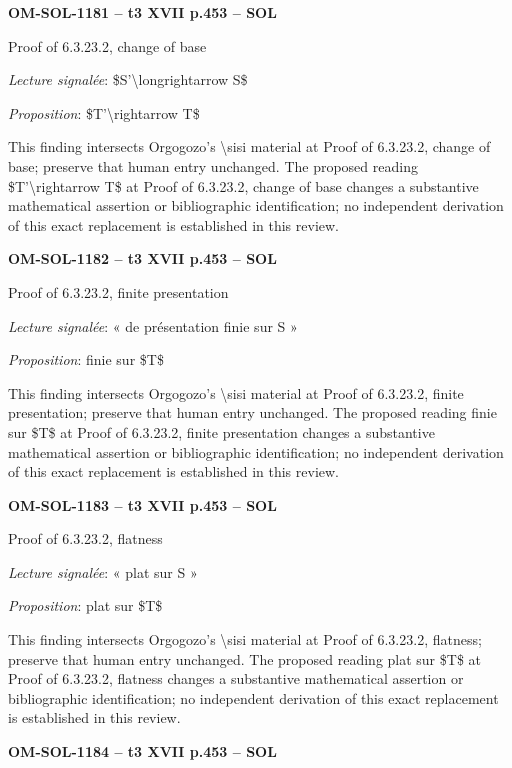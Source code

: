 \par\noindent\textbf{OM-SOL-1181 -- t3 XVII p.453 -- SOL}\par
Proof of 6.3.23.2, change of base\par
\emph{Lecture signalée}: \$S'\textbackslash{}longrightarrow S\$\par
\emph{Proposition}: \$T'\textbackslash{}rightarrow T\$\par
This finding intersects Orgogozo's \textbackslash{}sisi material at Proof of 6.3.23.2, change of base; preserve that human entry unchanged. The proposed reading \$T'\textbackslash{}rightarrow T\$ at Proof of 6.3.23.2, change of base changes a substantive mathematical assertion or bibliographic identification; no independent derivation of this exact replacement is established in this review.\par
\par\noindent\textbf{OM-SOL-1182 -- t3 XVII p.453 -- SOL}\par
Proof of 6.3.23.2, finite presentation\par
\emph{Lecture signalée}: « de présentation finie sur S »\par
\emph{Proposition}: finie sur \$T\$\par
This finding intersects Orgogozo's \textbackslash{}sisi material at Proof of 6.3.23.2, finite presentation; preserve that human entry unchanged. The proposed reading finie sur \$T\$ at Proof of 6.3.23.2, finite presentation changes a substantive mathematical assertion or bibliographic identification; no independent derivation of this exact replacement is established in this review.\par
\par\noindent\textbf{OM-SOL-1183 -- t3 XVII p.453 -- SOL}\par
Proof of 6.3.23.2, flatness\par
\emph{Lecture signalée}: « plat sur S »\par
\emph{Proposition}: plat sur \$T\$\par
This finding intersects Orgogozo's \textbackslash{}sisi material at Proof of 6.3.23.2, flatness; preserve that human entry unchanged. The proposed reading plat sur \$T\$ at Proof of 6.3.23.2, flatness changes a substantive mathematical assertion or bibliographic identification; no independent derivation of this exact replacement is established in this review.\par
\par\noindent\textbf{OM-SOL-1184 -- t3 XVII p.453 -- SOL}\par
